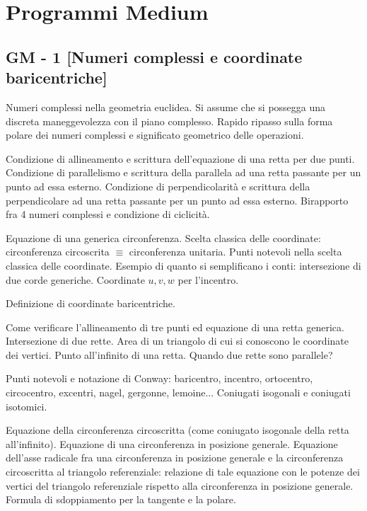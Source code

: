 \clearpage
\section{Programmi Medium}

\subsection{GM - 1 [Numeri complessi e coordinate baricentriche]}
Numeri complessi nella geometria euclidea. Si assume che si possegga una discreta maneggevolezza con il piano complesso.
Rapido ripasso sulla forma polare dei numeri complessi e significato geometrico delle operazioni.

Condizione di allineamento e scrittura dell'equazione di una retta per due punti. Condizione di parallelismo e scrittura della parallela ad una retta passante per un punto ad essa esterno. Condizione di perpendicolarità e scrittura della perpendicolare ad una retta passante per un punto ad essa esterno. Birapporto fra 4 numeri complessi e condizione di ciclicità.

Equazione di una generica circonferenza. Scelta classica delle coordinate: circonferenza circoscrita $\equiv$ circonferenza unitaria. Punti notevoli nella scelta classica delle coordinate. Esempio di quanto si semplificano i conti: intersezione di due corde generiche. Coordinate $u,v,w$ per l'incentro. 

\vspace{0.5cm}
Definizione di coordinate baricentriche. 

Come verificare l'allineamento di tre punti ed equazione di una retta generica. Intersezione di due rette. Area di un triangolo di cui si conoscono le coordinate dei vertici. Punto all'infinito di una retta. Quando due rette sono parallele?

Punti notevoli e notazione di Conway: baricentro, incentro, ortocentro, circocentro, excentri, nagel, gergonne, lemoine... Coniugati isogonali e coniugati isotomici.

Equazione della circonferenza circoscritta (come coniugato isogonale della retta all'infinito).
Equazione di una circonferenza in posizione generale. Equazione dell'asse radicale fra una circonferenza in posizione generale e la circonferenza circoscritta al triangolo referenziale: relazione di tale equazione con le potenze dei vertici del triangolo referenziale rispetto alla circonferenza in posizione generale. Formula di sdoppiamento per la tangente e la polare.

